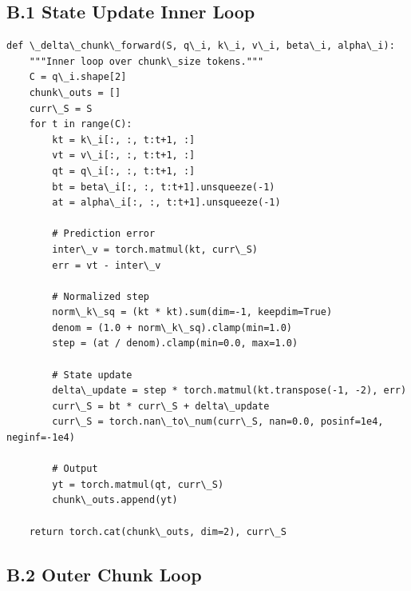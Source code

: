 \subsection{B.1 State Update Inner Loop}

\begin{lstlisting}
def \_delta\_chunk\_forward(S, q\_i, k\_i, v\_i, beta\_i, alpha\_i):
    """Inner loop over chunk\_size tokens."""
    C = q\_i.shape[2]
    chunk\_outs = []
    curr\_S = S
    for t in range(C):
        kt = k\_i[:, :, t:t+1, :]
        vt = v\_i[:, :, t:t+1, :]
        qt = q\_i[:, :, t:t+1, :]
        bt = beta\_i[:, :, t:t+1].unsqueeze(-1)
        at = alpha\_i[:, :, t:t+1].unsqueeze(-1)
        
        # Prediction error
        inter\_v = torch.matmul(kt, curr\_S)
        err = vt - inter\_v
        
        # Normalized step
        norm\_k\_sq = (kt * kt).sum(dim=-1, keepdim=True)
        denom = (1.0 + norm\_k\_sq).clamp(min=1.0)
        step = (at / denom).clamp(min=0.0, max=1.0)
        
        # State update
        delta\_update = step * torch.matmul(kt.transpose(-1, -2), err)
        curr\_S = bt * curr\_S + delta\_update
        curr\_S = torch.nan\_to\_num(curr\_S, nan=0.0, posinf=1e4, neginf=-1e4)
        
        # Output
        yt = torch.matmul(qt, curr\_S)
        chunk\_outs.append(yt)
    
    return torch.cat(chunk\_outs, dim=2), curr\_S
\end{lstlisting}

\subsection{B.2 Outer Chunk Loop}

